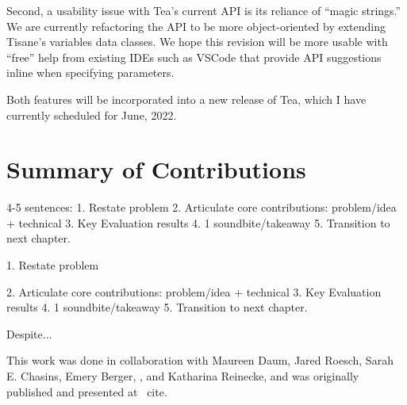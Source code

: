 Second, a usability issue with Tea's current API is its reliance of ``magic
strings.'' We are currently refactoring the API to be more object-oriented by
extending Tisane's variables data classes. We hope this revision will be more
usable with ``free'' help from existing IDEs such as VSCode that provide API
suggestions inline when specifying parameters. 

Both features will be incorporated into a new release of Tea, which I have
currently scheduled for June, 2022. 

\section{Summary of Contributions}
4-5 sentences: 
1. Restate problem 
2. Articulate core contributions: problem/idea + technical
3. Key Evaluation results
4. 1 soundbite/takeaway
5. Transition to next chapter. 

1. Restate problem 

2. Articulate core contributions: problem/idea + technical
3. Key Evaluation results
4. 1 soundbite/takeaway
5. Transition to next chapter. 

Despite...



This work was done in collaboration with Maureen Daum, Jared Roesch, Sarah E.
Chasins, Emery Berger, \reneJust, and Katharina Reinecke, and was originally
published and presented at ~cite{}.
